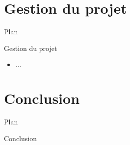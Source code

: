 \documentclass{beamer}
\begin{document}
\section{Gestion du projet}
\begin{frame}{Plan}
    \tableofcontents[currentsection]
\end{frame}

\begin{frame}{Gestion du projet}
    \begin{itemize}
        \item ...
    \end{itemize}
\end{frame}

\section{Conclusion}
\begin{frame}{Plan}
    \tableofcontents[currentsection]
\end{frame}
\begin{frame}{Conclusion}
\end{frame}
\end{document}
